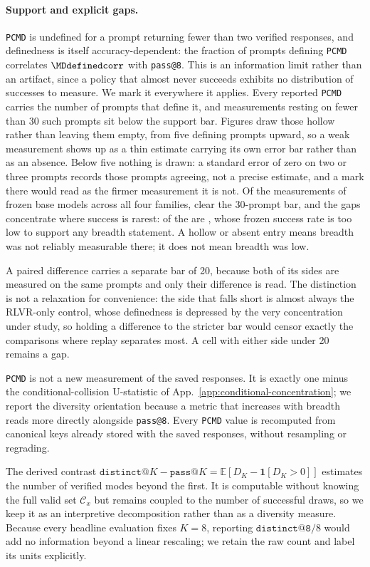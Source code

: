 \documentclass{article}
\newcommand{\1}{\mathbf 1}
\newcommand{\E}{\mathbb E}
\newcommand{\pmd}{\texttt{PCMD}}
\theoremstyle{remark}
\theoremstyle{definition}
\theoremstyle{plain}
\begin{document}
\paragraph{Support and explicit gaps.}
\pmd{} is undefined for a prompt returning fewer than two verified responses,
and definedness is itself accuracy-dependent: the fraction of prompts defining
\pmd{} correlates $\MDdefinedcorr$ with \texttt{pass@8}. This is an information
limit rather than an artifact, since a policy that almost never succeeds
exhibits no distribution of successes to measure. We mark it everywhere it
applies.
Every reported \pmd{} carries the number of prompts that define it, and
measurements resting on fewer than 30 such prompts sit below the support bar.
Figures draw those hollow rather than leaving them empty, from five defining
prompts upward, so a weak measurement shows up as a thin estimate carrying its
own error bar rather than as an absence. Below five nothing is drawn: a
standard error of zero on two or three prompts records those prompts agreeing,
not a precise estimate, and a mark there would read as the firmer measurement
it is not. Of the
\MDcells{} measurements of frozen base models across all four families,
\MDreportable{} clear the 30-prompt bar,
and the gaps concentrate where success is rarest: \MDtopgapcount{} of
the \MDgaps{} are \MDtopgapdomain{}, whose frozen success rate is too low to
support any breadth statement. A hollow or absent entry means breadth was
not reliably measurable there; it does not mean breadth was low.

A paired difference carries a separate bar of 20, because both of its sides are
measured on the same prompts and only their difference is read. The distinction
is not a relaxation for convenience: the side that falls short is almost always
the RLVR-only control, whose definedness is depressed by the very concentration
under study, so holding a difference to the stricter bar would censor exactly
the comparisons where replay separates most. A cell with either side under 20
remains a gap.

\pmd{} is not a new measurement of the saved responses. It is exactly one minus
the conditional-collision U-statistic of
App.~\ref{app:conditional-concentration}; we report the diversity orientation
because a metric that increases with breadth reads more directly alongside
\texttt{pass@8}. Every \pmd{} value
is recomputed from canonical keys already stored with the saved responses,
without resampling or regrading.

The derived contrast $\texttt{distinct@}K-\texttt{pass@}K=\E[D_K-\1[D_K>0]]$
estimates the number of verified modes beyond the first. It is computable
without knowing the full valid set $\mathcal C_x$ but remains coupled to the
number of successful draws, so we keep it as an interpretive decomposition
rather than as a diversity measure. Because every
headline evaluation fixes $K=8$, reporting $\texttt{distinct@8}/8$ would add no
information beyond a linear rescaling; we retain the raw count and label its
units explicitly.
\end{document}
